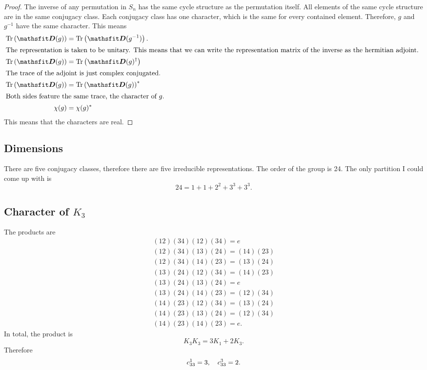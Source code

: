 \documentclass[11pt, english, fleqn, DIV=15, headinclude, BCOR=1cm]{scrartcl}
\DeclareMathOperator{\Tr}{Tr}
\newcommand\inv{^{-1}}
\begin{document}
\begin{proof}
    The inverse of any permutation in $S_n$ has the same cycle structure as the
    permutation itself. All elements of the same cycle structure are in the
    same conjugacy class. Each conjugacy class has one character, which is the
    same for every contained element. Therefore, $g$ and $g\inv$ have the same
    character. This means
    \begin{align*}
        \Tr\del{\tens D(g)} &= \Tr\del{\tens D(g\inv)}. \\
        \intertext{%
            The representation is taken to be unitary. This means that we can
            write the representation matrix of the inverse as the hermitian
            adjoint.
        }
        \Tr\del{\tens D(g)} &= \Tr\del{\tens D(g)^\dagger} \\
        \intertext{%
            The trace of the adjoint is just complex conjugated.
        }
        \Tr\del{\tens D(g)} &= \Tr\del{\tens D(g)}^* \\
        \intertext{%
            Both sides feature the same trace, the character of $g$.
        }
        \chi(g) &= \chi(g)^*
    \end{align*}
    This means that the characters are real.
\end{proof}

\subsection{Dimensions}

There are five conjugacy classes, therefore there are five irreducible
representations. The order of the group is 24. The only partition I could come
up with is
\[
    24 = 1 + 1 + 2^2 + 3^3 + 3^3.
\]

\subsection{Character of $K_3$}

The products are
\begin{gather*}
    (12)(34)(12)(34) = e \\
    (12)(34)(13)(24) = (14)(23) \\
    (12)(34)(14)(23) = (13)(24) \\
    (13)(24)(12)(34) = (14)(23) \\
    (13)(24)(13)(24) = e \\
    (13)(24)(14)(23) = (12)(34) \\
    (14)(23)(12)(34) = (13)(24) \\
    (14)(23)(13)(24) = (12)(34) \\ 
    (14)(23)(14)(23) = e.
\end{gather*}
In total, the product is
\[
    K_3 K_3 = 3 K_1 + 2 K_3.
\]
Therefore
\[
    c_{33}^1 = 3
    ,\quad
    c_{33}^3 = 2.
\]
\end{document}
